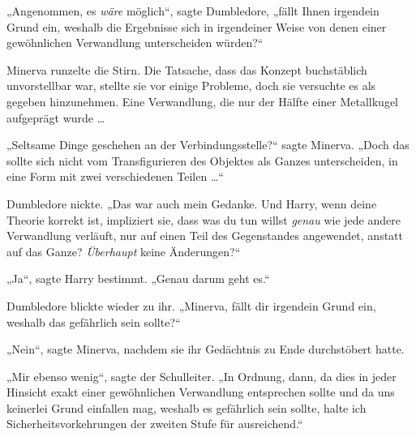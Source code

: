 „Angenommen, es \emph{wäre} möglich“, sagte Dumbledore, „fällt Ihnen irgendein Grund ein, weshalb die Ergebnisse sich in irgendeiner Weise von denen einer gewöhnlichen Verwandlung unterscheiden würden?“

Minerva runzelte die Stirn. Die Tatsache, dass das Konzept buchstäblich unvorstellbar war, stellte sie vor einige Probleme, doch sie versuchte es als gegeben hinzunehmen. Eine Verwandlung, die nur der Hälfte einer Metallkugel aufgeprägt wurde …

„Seltsame Dinge geschehen an der Verbindungsstelle?“ sagte Minerva.
„Doch das sollte sich nicht vom Transfigurieren des Objektes als Ganzes unterscheiden, in eine Form mit zwei verschiedenen Teilen …“

Dumbledore nickte.
„Das war auch mein Gedanke. Und Harry, wenn deine Theorie korrekt ist, impliziert sie, dass was du tun willst \emph{genau} wie jede andere Verwandlung verläuft, nur auf einen Teil des Gegenstandes angewendet, anstatt auf das Ganze? \emph{Überhaupt} keine Änderungen?“

„Ja“, sagte Harry bestimmt.
„Genau darum geht es.“

Dumbledore blickte wieder zu ihr.
„Minerva, fällt dir irgendein Grund ein, weshalb das gefährlich sein sollte?“

„Nein“, sagte Minerva, nachdem sie ihr Gedächtnis zu Ende durchstöbert hatte.

„Mir ebenso wenig“, sagte der Schulleiter.
„In Ordnung, dann, da dies in jeder Hinsicht exakt einer gewöhnlichen Verwandlung entsprechen sollte und da uns keinerlei Grund einfallen mag, weshalb es gefährlich sein sollte, halte ich Sicherheitsvorkehrungen der zweiten Stufe für ausreichend.“

